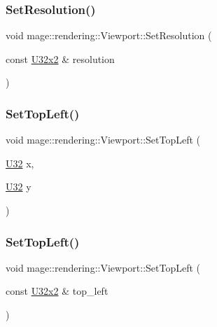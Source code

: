 \subsubsection{\texorpdfstring{Set\+Resolution()}{SetResolution()}\hspace{0.1cm}{\footnotesize\ttfamily [2/2]}}
{\footnotesize\ttfamily void mage\+::rendering\+::\+Viewport\+::\+Set\+Resolution (\begin{DoxyParamCaption}\item[{const \hyperlink{namespacemage_a88e05bff0300120c013285d3dcad95c5}{U32x2} \&}]{resolution }\end{DoxyParamCaption})\hspace{0.3cm}{\ttfamily [noexcept]}}

\hypertarget{classmage_1_1rendering_1_1_viewport_a281e2fdd022aa9714741f5291be1c6ef}{}\label{classmage_1_1rendering_1_1_viewport_a281e2fdd022aa9714741f5291be1c6ef} 
\subsubsection{\texorpdfstring{Set\+Top\+Left()}{SetTopLeft()}\hspace{0.1cm}{\footnotesize\ttfamily [1/2]}}
{\footnotesize\ttfamily void mage\+::rendering\+::\+Viewport\+::\+Set\+Top\+Left (\begin{DoxyParamCaption}\item[{\hyperlink{namespacemage_a41c104c036fba3756a74e19f793eeaa1}{U32}}]{x,  }\item[{\hyperlink{namespacemage_a41c104c036fba3756a74e19f793eeaa1}{U32}}]{y }\end{DoxyParamCaption})\hspace{0.3cm}{\ttfamily [noexcept]}}

\hypertarget{classmage_1_1rendering_1_1_viewport_a22ea70a6e01b8328ba94d90e374e85cb}{}\label{classmage_1_1rendering_1_1_viewport_a22ea70a6e01b8328ba94d90e374e85cb} 
\subsubsection{\texorpdfstring{Set\+Top\+Left()}{SetTopLeft()}\hspace{0.1cm}{\footnotesize\ttfamily [2/2]}}
{\footnotesize\ttfamily void mage\+::rendering\+::\+Viewport\+::\+Set\+Top\+Left (\begin{DoxyParamCaption}\item[{const \hyperlink{namespacemage_a88e05bff0300120c013285d3dcad95c5}{U32x2} \&}]{top\+\_\+left }\end{DoxyParamCaption})\hspace{0.3cm}{\ttfamily [noexcept]}}

